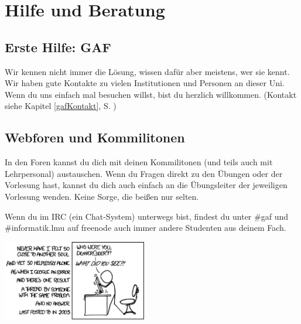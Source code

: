 \chapter{Hilfe und Beratung}

\section{Erste Hilfe: GAF}

Wir kennen nicht immer die Lösung, wissen dafür aber meistens, wer sie
kennt. Wir haben gute Kontakte zu vielen Institutionen und Personen an
dieser Uni. Wenn du uns einfach mal besuchen willst, bist du herzlich
willkommen. (Kontakt siehe Kapitel \ref{gafKontakt}, S. \pageref{gafKontakt})


\section{Webforen und Kommilitonen}

In den Foren kannst du dich mit deinen Kommilitonen
(und teils auch mit Lehrpersonal) austauschen. Wenn du Fragen direkt zu den
Übungen oder der Vorlesung hast, kannst du dich auch einfach an die
Übungsleiter der jeweiligen Vorlesung wenden. Keine Sorge, die beißen nur
selten.

Wenn du im IRC (ein Chat-System) unterwegs bist, findest du unter \#gaf und \#informatik.lmu auf
freenode auch immer andere Studenten aus deinem Fach.

\begin{urlList}
\end{urlList}

\skiptobottom
\begin{center}
	{\includegraphics[height=3.5cm]{img/wisdom_of_the_ancients}}
\end{center}



